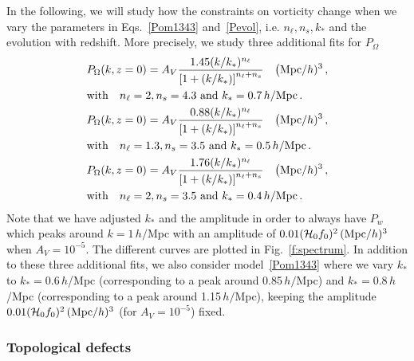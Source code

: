 \documentclass[a4paper,twocolumn,aps,prd,nolongbibliography,superscriptaddress,showpacs,showkeys,amsmath,amssymb,floatfix,nofootinbib]{revtex4-1}
\renewcommand{\[}{\begin{equation}}
\renewcommand{\]}{\end{equation}}
\newcommand{\Hcal}{\mathcal{H}}
\begin{document}
In the following, we will study how the constraints on vorticity change when we vary the parameters in Eqs.~\eqref{Pom1343} and~\eqref{Pevol}, i.e. $n_\ell, n_s, k_*$ and the evolution with redshift. More precisely, we study three additional fits for $P_\Omega$
\begin{align}
&P_\Omega (k,z=0)=A_V \frac{1.45(k/k_*)^{n_\ell}}{\left[ 1+ (k/k_*) \right]^{n_\ell+n_s}}\quad \big({\rm Mpc}/h)^3\, ,\nonumber\\
&{\rm with}\quad n_\ell=2, n_s=4.3\,\, {\rm and}\,\, k_*=0.7\,h/{\rm Mpc}\, .\label{Pom243}\\
&P_\Omega (k,z=0)=A_V \frac{0.88(k/k_*)^{n_\ell}}{\left[1+ (k/k_*) \right]^{n_\ell+n_s}}\quad \big({\rm Mpc}/h)^3\, ,\nonumber\\
&{\rm with}\quad n_\ell=1.3, n_s=3.5\,\, {\rm and}\,\, k_*=0.5\,h/{\rm Mpc}\, .\label{Pom1335}\\
&P_\Omega (k,z=0)=A_V \frac{1.76(k/k_*)^{n_\ell}}{\left[1+ (k/k_*) \right]^{n_\ell+n_s}}\quad \big({\rm Mpc}/h)^3\, ,\nonumber\\
&{\rm with}\quad n_\ell=2, n_s=3.5\,\, {\rm and}\,\, k_*=0.4\,h/{\rm Mpc}\, .\label{Pom235}
\end{align}
Note that we have adjusted $k_*$ and the amplitude in order to always have $P_w$ which peaks around $k=1\,h/$Mpc with an amplitude of $0.01(\Hcal_0f_0)^2\, ({\rm Mpc}/h)^3$ when $A_V=10^{-5}$. The different curves are plotted in Fig.~\ref{f:spectrum}. In addition to these three additional fits, we also consider model~\eqref{Pom1343} where we vary $k_*$ to $k_*=0.6\,h$/Mpc (corresponding to a peak around 0.85\,$h/$Mpc) and $k_*=0.8\,h$/Mpc (corresponding to a peak around 1.15\,$h/$Mpc), keeping the amplitude $0.01(\Hcal_0f_0)^2\, ({\rm Mpc}/h)^3$ (for $A_V=10^{-5}$) fixed.

\subsubsection{Topological defects}
\end{document}
